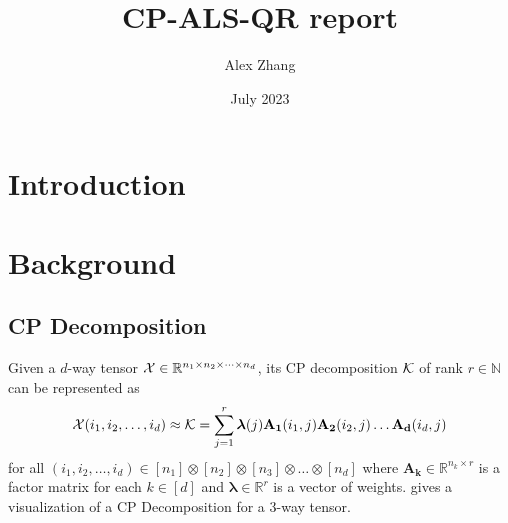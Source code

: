 \documentclass{article}
\title{CP-ALS-QR report}
\author{Alex Zhang}
\date{July 2023}
\newcommand{\mat}[1]{\mathbf{#1}}
\newcommand{\V}[2][]{\bm{#1{\mathbf{\MakeLowercase{#2}}}}} 		%
\newcommand{\T}[2][]{#1{\mathbf{\cal{#2}}}} 						%
\begin{document}
\maketitle
\section{Introduction}







\section{Background}
\subsection{CP Decomposition}
Given a $d$-way tensor $\T{X} \in \mathbb{R}^{n_1\times n_2\times \dots \times n_d}$, its
CP decomposition $\T{K}$ of rank $r \in \mathbb{N}$ can be represented as 
\begin{equation}
\label{eq:CP}
\T{X}(i_1,i_2,\dots, i_d) \approx \T{K} = \sum^{r}_{j=1} \V{\lambda}(j) \mat{A_1}(i_1,j)\mat{A_2}(i_2,j) \dots \mat{A_d}(i_d,j)
\end{equation}
for all $(i_1,i_2,\dots, i_d) \in [n_1] \otimes [n_2] \otimes [n_3] \otimes \dots \otimes [n_d]$ where $\mat{A_k} \in \mathbb{R}^{n_k \times r}$ is a factor matrix for each $k \in [d]$ and $\bm{\lambda}\in\mathbb{R}^r$ is a vector of weights. 
 gives a visualization of a CP Decomposition for a 3-way tensor.
\end{document}
